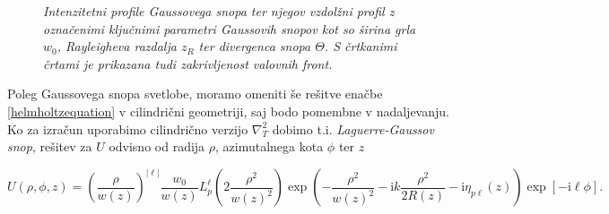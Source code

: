 \documentclass[longbibliography,slovene,a4paper,12pt]{book}
\newcommand{\I}{\text{i}}
\begin{document}
\begin{figure}[h!]
\begin{subfigure}[b]{0.45\textwidth}
	\label{fig:gaussianbeamprofile}
	\end{subfigure}
	\caption{\emph{Intenzitetni profile Gaussovega snopa ter njegov vzdolžni profil z označenimi ključnimi parametri Gaussovih snopov kot so širina grla $w_0$, Rayleigheva razdalja $z_R$ ter divergenca snopa $\Theta$. S črtkanimi črtami je prikazana tudi zakrivljenost valovnih front.}}
\end{figure} 

Poleg Gaussovega snopa svetlobe, moramo omeniti še rešitve enačbe \ref{helmholtzequation} v cilindrični geometriji, saj bodo pomembne v nadaljevanju. Ko za izračun uporabimo cilindrično verzijo $\nabla_T^2$ dobimo t.i. \emph{Laguerre-Gaussov snop}, rešitev za $U$ odvisno od radija $\rho$, azimutalnega kota $\phi$ ter $z$

\begin{equation}
U(\rho, \phi, z) = \left( \frac{\rho}{w(z)} \right )^{|\ell|} \frac{w_0}{w(z)}  L_p^\ell \left (2\frac{\rho^2}{w(z)^2} \right )  \exp \left ( -\frac{\rho^2}{w(z)^2} - \I k\frac{\rho^2}{2R(z)} - \I \eta_{p\ell} (z) \right ) \exp [ -\I \ell \phi].
\label{laguerregaussianamplitude}
\end{equation}
\end{document}

